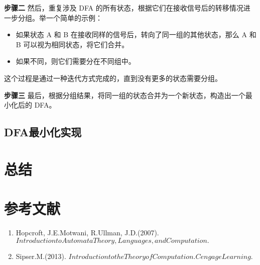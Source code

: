 \documentclass{article}
\begin{document}
    \textbf{步骤二}
    然后，重复涉及 DFA 的所有状态，根据它们在接收信号后的转移情况进一步分组。举一个简单的示例：
    \begin{itemize}
        \item 如果状态 A 和 B 在接收同样的信号后，转向了同一组的其他状态，那么 A 和 B 可以视为相同状态，将它们合并。
        \item 如果不同，则它们需要分在不同组中。
    \end{itemize}
    这个过程是通过一种迭代方式完成的，直到没有更多的状态需要分组。

    \textbf{步骤三}
    最后，根据分组结果，将同一组的状态合并为一个新状态，构造出一个最小化后的 DFA。
\subsection{DFA最小化实现}




\section{总结}




\section{参考文献}
\begin{enumerate}
    \item Hopcroft, J.E.Motwani, R.Ullman, J.D.(2007). $Introduction to Automata Theory, Languages, and Computation.$
    \item Sipser.M.(2013). $Introduction to the Theory of Computation. Cengage Learning.$
\end{enumerate}
\end{document}
